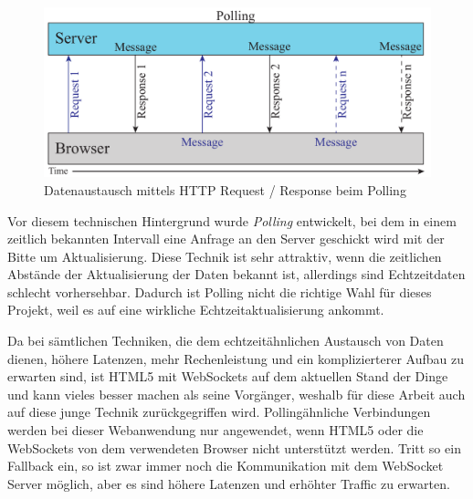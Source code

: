 \begin{figure}[!ht]
	\centering
	\includegraphics[width=15cm]{fig/polling}
	\caption[Datenaustausch beim Polling]{Datenaustausch mittels HTTP Request / Response beim Polling {\cite[S. 7]{ws}}}
\end{figure}

Vor diesem technischen Hintergrund wurde \emph{Polling} entwickelt, bei dem in einem zeitlich bekannten Intervall eine Anfrage an den Server geschickt wird mit der Bitte um Aktualisierung. Diese Technik ist sehr attraktiv, wenn die zeitlichen Abstände der Aktualisierung der Daten bekannt ist, allerdings sind Echtzeitdaten schlecht vorhersehbar. Dadurch ist Polling nicht die richtige Wahl für dieses Projekt, weil es auf eine wirkliche Echtzeitaktualisierung ankommt.\par

Da bei sämtlichen Techniken, die dem echtzeitähnlichen Austausch von Daten dienen, höhere Latenzen, mehr Rechenleistung und ein komplizierterer Aufbau zu erwarten sind, ist HTML5 mit WebSockets auf dem aktuellen Stand der Dinge und kann vieles besser machen als seine Vorgänger, weshalb für diese Arbeit auch auf diese junge Technik zurückgegriffen wird. Pollingähnliche Verbindungen werden bei dieser Webanwendung nur angewendet, wenn HTML5 oder die WebSockets von dem verwendeten Browser nicht unterstützt werden. Tritt so ein Fallback ein, so ist zwar immer noch die Kommunikation mit dem WebSocket Server möglich, aber es sind höhere Latenzen und erhöhter Traffic zu erwarten.